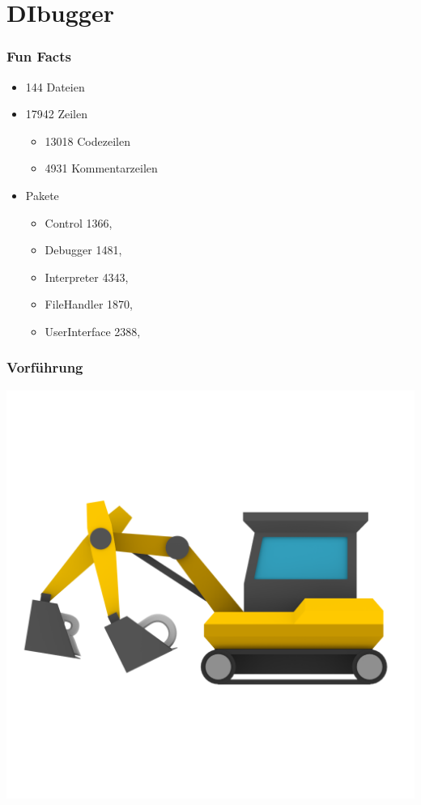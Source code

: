 \documentclass{beamer}
\begin{document}
\section{DIbugger}
\begin{frame}
\frametitle{Fun Facts}
\begin{itemize}
\item 144 Dateien
\item 17942 Zeilen
\begin{itemize}
\item 13018 Codezeilen
\item 4931 Kommentarzeilen
\end{itemize}
\item Pakete
\begin{itemize}
\item Control 1366, %
\item Debugger 1481, %
\item Interpreter 4343, %
\item FileHandler 1870, %
\item UserInterface 2388, %
\end{itemize}
\end{itemize}
\end{frame}

\begin{frame}
\frametitle{Vorführung}
\begin{center}
\includegraphics[scale=0.2]{../DIbugger/res/ui/logo_nongi.png}
\end{center}
\end{frame}
\end{document}

